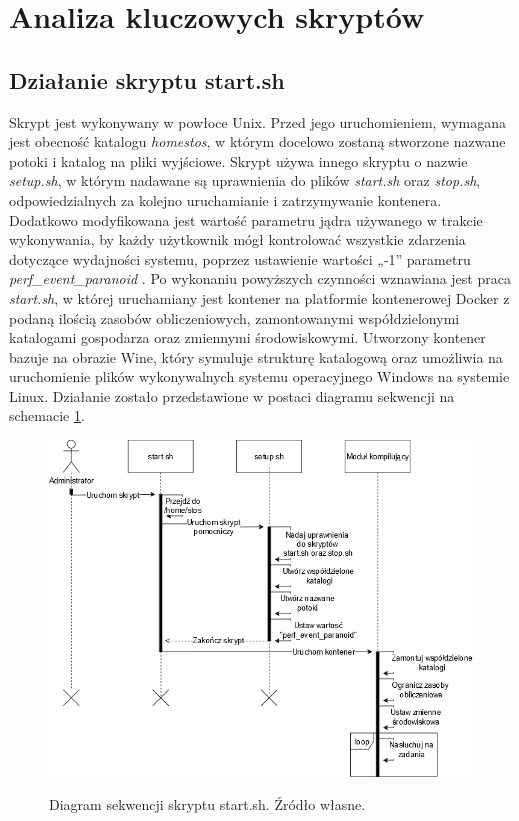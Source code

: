 \section{Analiza kluczowych skryptów}
\subsection{Działanie skryptu start.sh}
\indent Skrypt jest wykonywany w powłoce Unix. Przed jego uruchomieniem, wymagana jest obecność katalogu \textit{\/home\/stos}, w którym docelowo zostaną stworzone nazwane potoki i katalog na pliki wyjściowe. Skrypt używa innego skryptu o nazwie \textit{setup.sh}, w którym nadawane są uprawnienia do plików \textit{start.sh} oraz \textit{stop.sh}, odpowiedzialnych za kolejno uruchamianie i zatrzymywanie kontenera. Dodatkowo modyfikowana jest wartość parametru jądra używanego w trakcie wykonywania, by każdy użytkownik mógł kontrolować wszystkie zdarzenia dotyczące wydajności systemu, poprzez ustawienie wartości „-1” parametru \textit{perf\_event\_paranoid} \cite{perf}. Po wykonaniu powyższych czynności wznawiana jest praca \textit{start.sh}, w której uruchamiany jest kontener na platformie kontenerowej Docker z podaną ilością zasobów obliczeniowych, zamontowanymi współdzielonymi katalogami gospodarza oraz zmiennymi środowiskowymi. Utworzony kontener bazuje na obrazie Wine, który symuluje strukturę katalogową oraz umożliwia na uruchomienie plików wykonywalnych systemu operacyjnego Windows na systemie Linux. Działanie zostało przedstawione w postaci diagramu sekwencji na schemacie \ref{start}.
\begin{figure}[!h]
	\begin{center}
		\resizebox{1.0\textwidth}{!} {
			\includegraphics{img/2/start.png}
		}
		\caption[Diagram sekwenji skryptu start.sh]{Diagram sekwencji skryptu start.sh. Źródło własne.}
		\label{start}
	\end{center}
\end{figure}

